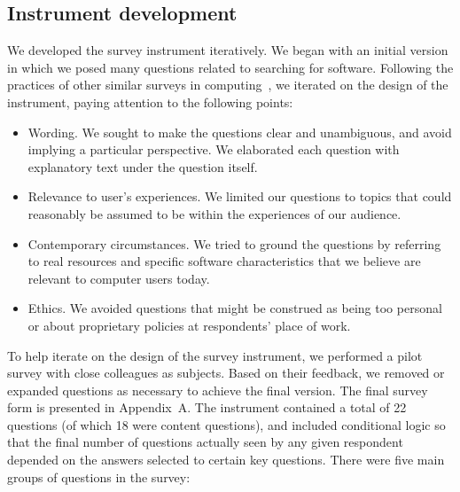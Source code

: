\documentclass{casicswhitepaper}
\begin{document}
\subsection{Instrument development}

We developed the survey instrument iteratively.  We began with an initial version in which we posed many questions related to searching for software.  Following the practices of other similar surveys in computing~\cite[e.g.,][]{varnellsarjeant2015comparing}, we iterated on the design of the instrument, paying attention to the following points:

\begin{itemize}

\item Wording.  We sought to make the questions clear and unambiguous, and avoid implying a particular perspective.  We elaborated each question with explanatory text under the question itself.

\item Relevance to user's experiences.  We limited our questions to topics that could reasonably be assumed to be within the experiences of our audience.

\item Contemporary circumstances.  We tried to ground the questions by referring to real resources and specific software characteristics that we believe are relevant to computer users today.

\item Ethics.  We avoided questions that might be construed as being too personal or about proprietary policies at respondents' place of work.

\end{itemize}

To help iterate on the design of the survey instrument, we performed a pilot survey with close colleagues as subjects.  Based on their feedback, we removed or expanded questions as necessary to achieve the final version.  The final survey form is presented in Appendix~A.  The instrument contained a total of 22 questions (of which 18 were content questions), and included conditional logic so that the final number of questions actually seen by any given respondent depended on the answers selected to certain key questions.  There were five main groups of questions in the survey:
\end{document}
